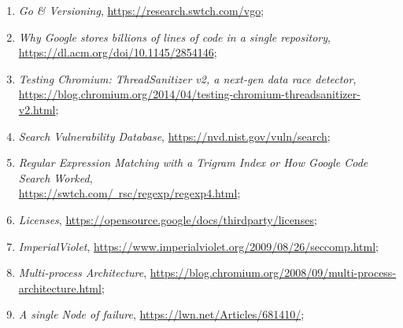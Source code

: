\documentclass[a4paper,11pt]{article}
\begin{document}
\begin{enumerate}
\item \textit{Go \& Versioning},
  \href{https://research.swtch.com/vgo}{https://research.swtch.com/vgo};



\item \textit{Why Google stores billions of lines of code in a single
    repository},
  \href{https://dl.acm.org/doi/10.1145/2854146}{https://dl.acm.org/doi/10.1145/2854146};



\item \textit{Testing Chromium: ThreadSanitizer v2, a next-gen data
    race
    detector}, \\
  \href{https://blog.chromium.org/2014/04/testing-chromium-threadsanitizer-v2.html}{https://blog.chromium.org/2014/04/testing-chromium-threadsanitizer-v2.html};



\item \textit{Search Vulnerability Database},
  \href{https://nvd.nist.gov/vuln/search}{https://nvd.nist.gov/vuln/search};



\item \textit{Regular Expression Matching with a Trigram Index or How
    Google Code Search Worked}, \\
  \href{https://swtch.com/~rsc/regexp/regexp4.html}{https://swtch.com/~rsc/regexp/regexp4.html};



\item \textit{Licenses},
  \href{https://opensource.google/docs/thirdparty/licenses}{https://opensource.google/docs/thirdparty/licenses};



\item \textit{ImperialViolet},
  \href{https://www.imperialviolet.org/2009/08/26/seccomp.html}{https://www.imperialviolet.org/2009/08/26/seccomp.html};



\item \textit{Multi-process Architecture},
  \href{https://blog.chromium.org/2008/09/multi-process-architecture.html}{https://blog.chromium.org/2008/09/multi-process-architecture.html};



\item \textit{A single Node of failure},
  \href{https://lwn.net/Articles/681410/}{https://lwn.net/Articles/681410/};




\end{enumerate}
\end{document}
